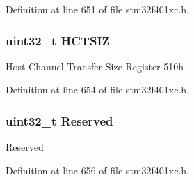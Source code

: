 Definition at line 651 of file stm32f401xc.\+h.

\subsubsection[{\texorpdfstring{H\+C\+T\+S\+IZ}{HCTSIZ}}]{ uint32\+\_\+t H\+C\+T\+S\+IZ}\hypertarget{struct_u_s_b___o_t_g___host_channel_type_def_adde42c516172a887c570545d965200cf}{}\label{struct_u_s_b___o_t_g___host_channel_type_def_adde42c516172a887c570545d965200cf}
Host Channel Transfer Size Register 510h 

Definition at line 654 of file stm32f401xc.\+h.

\subsubsection[{\texorpdfstring{Reserved}{Reserved}}]{\setlength{\rightskip}{0pt plus 5cm}uint32\+\_\+t Reserved}\hypertarget{struct_u_s_b___o_t_g___host_channel_type_def_afa710a7c5f28fe6dcb59d7b89112b0d0}{}\label{struct_u_s_b___o_t_g___host_channel_type_def_afa710a7c5f28fe6dcb59d7b89112b0d0}
Reserved 

Definition at line 656 of file stm32f401xc.\+h.



